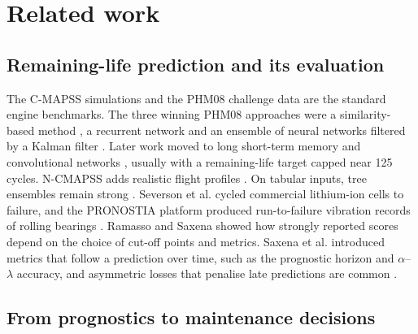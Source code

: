 \documentclass[a4paper,fleqn,doubleblind]{cas-dc}
\begin{document}
\section{Related work}\label{sec:2}

\subsection{Remaining-life prediction and its evaluation}

The C-MAPSS simulations and the PHM08 challenge data \cite{saxena2008} are the standard engine benchmarks. The three winning PHM08 approaches were a similarity-based method \cite{wang2008}, a recurrent network \cite{heimes2008} and an ensemble of neural networks filtered by a Kalman filter \cite{peel2008}. Later work moved to long short-term memory \cite{zheng2017} and convolutional networks \cite{li2018}, usually with a remaining-life target capped near 125 cycles. N-CMAPSS adds realistic flight profiles \cite{ariaschao2021}. On tabular inputs, tree ensembles remain strong \cite{grinsztajn2022,friedman2001}. Severson et al. \cite{severson2019} cycled commercial lithium-ion cells to failure, and the PRONOSTIA platform produced run-to-failure vibration records of rolling bearings \cite{nectoux2012}. Ramasso and Saxena \cite{ramasso2014} showed how strongly reported scores depend on the choice of cut-off points and metrics. Saxena et al. \cite{saxena2010} introduced metrics that follow a prediction over time, such as the prognostic horizon and $\alpha$--$\lambda$ accuracy, and asymmetric losses that penalise late predictions are common \cite{rengasamy2020}.

\subsection{From prognostics to maintenance decisions}
\end{document}
